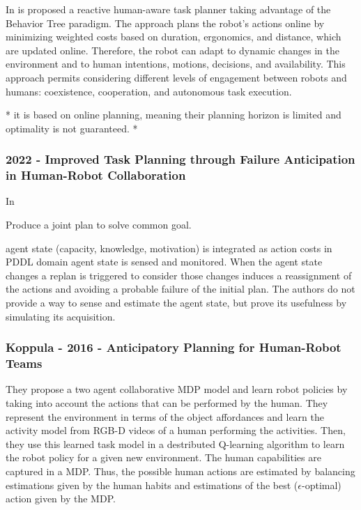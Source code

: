 In \cite{fusaro_human_aware_2021} is proposed a reactive human-aware task planner taking advantage of the Behavior Tree paradigm. The approach plans the robot's actions online by minimizing weighted costs based on duration, ergonomics, and distance, which are updated online. Therefore, the robot can adapt to dynamic changes in the environment and to human intentions, motions, decisions, and availability. This approach permits considering different levels of engagement between robots and humans: coexistence, cooperation, and autonomous task execution. 

* it is based on online planning, meaning their planning horizon is limited and optimality is not guaranteed. *

\subsubsection{2022 - Improved Task Planning through Failure Anticipation in Human-Robot Collaboration}
\label{w11}

In \cite{izquierdo_badiola_improved_2022}

Produce a joint plan to solve common goal. 

agent state (capacity, knowledge, motivation) is integrated  as action costs in PDDL domain
agent state is sensed and monitored.
When the agent state changes a replan is triggered to consider those changes induces a reassignment of the actions and avoiding a probable failure of the initial plan.
The authors do not provide a way to sense and estimate the agent state, but prove its usefulness by simulating its acquisition.

\subsubsection{Koppula - 2016 - Anticipatory Planning for Human-Robot Teams}

\cite{koppula2016anticipatory}

They propose a two agent collaborative MDP model and learn robot policies by taking into account the actions that can be performed by the human. They represent the environment in terms of the object affordances and learn the activity model from RGB-D videos of a human performing the activities. Then, they use this learned task model in a destributed Q-learning algorithm to learn the robot policy for a given new environment. 
The human capabilities are captured in a MDP. Thus, the possible human actions are estimated by balancing estimations given by the human habits and estimations of the best ($\epsilon$-optimal) action given by the MDP. 

